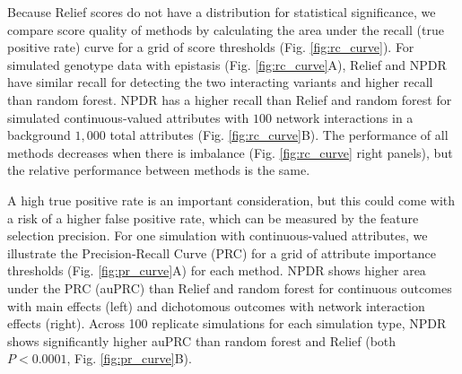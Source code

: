 \documentclass{bioinfo}
\begin{document}
Because Relief scores do not have a distribution for statistical significance, we compare score quality of methods by calculating the area under the recall (true positive rate) curve for a grid of score thresholds (Fig. \ref{fig:rc_curve}). For simulated genotype data with epistasis (Fig. \ref{fig:rc_curve}A), Relief and NPDR have similar recall for detecting the two interacting variants and higher recall than random forest. NPDR has a higher recall than Relief and random forest for simulated continuous-valued attributes with $100$ network interactions in a background $1,000$ total attributes (Fig. \ref{fig:rc_curve}B). The performance of all methods decreases when there is imbalance (Fig. \ref{fig:rc_curve} right panels), but the relative performance between methods is the same.   

A high true positive rate is an important consideration, but this could come with a risk of a higher false positive rate, which can be measured by the feature selection precision. 
For one simulation with continuous-valued attributes, we illustrate the Precision-Recall Curve (PRC) for a grid of attribute importance thresholds (Fig. \ref{fig:pr_curve}A) for each method. NPDR shows higher area under the PRC (auPRC) than Relief and random forest for continuous outcomes with main effects (left) and dichotomous outcomes with network interaction effects (right).
Across 100 replicate simulations for each simulation type, NPDR shows significantly higher auPRC than random forest and Relief (both $P < 0.0001$, Fig. \ref{fig:pr_curve}B). 
\end{document}
